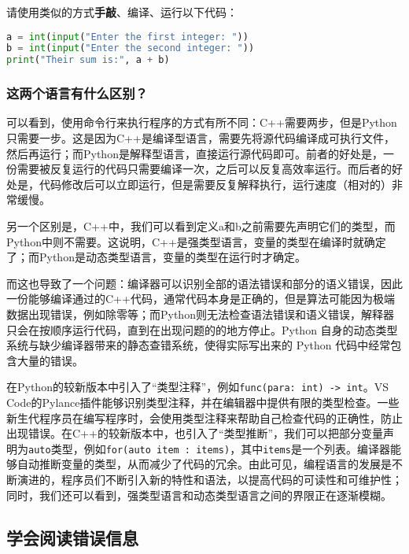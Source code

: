 请使用类似的方式\textbf{手敲}、编译、运行以下代码：

\begin{lstlisting}[language=Python]
a = int(input("Enter the first integer: "))
b = int(input("Enter the second integer: "))
print("Their sum is:", a + b)
\end{lstlisting}

\subsubsection{这两个语言有什么区别？}

可以看到，使用命令行来执行程序的方式有所不同：C++需要两步，但是Python只需要一步。这是因为C++是编译型语言，需要先将源代码编译成可执行文件，然后再运行；而Python是解释型语言，直接运行源代码即可。前者的好处是，一份需要被反复运行的代码只需要编译一次，之后可以反复高效率运行。而后者的好处是，代码修改后可以立即运行，但是需要反复解释执行，运行速度（相对的）非常缓慢。

另一个区别是，C++中，我们可以看到定义a和b之前需要先声明它们的类型，而Python中则不需要。这说明，C++是强类型语言，变量的类型在编译时就确定了；而Python是动态类型语言，变量的类型在运行时才确定。

而这也导致了一个问题：编译器可以识别全部的语法错误和部分的语义错误，因此一份能够编译通过的C++代码，通常代码本身是正确的，但是算法可能因为极端数据出现错误，例如除零等；而Python则无法检查语法错误和语义错误，解释器只会在按顺序运行代码，直到在出现问题的的地方停止。Python 自身的动态类型系统与缺少编译器带来的静态查错系统，使得实际写出来的 Python 代码中经常包含大量的错误。

\begin{note}
  在Python的较新版本中引入了“类型注释”，例如\texttt{func(para: int) -> int}。VS Code的Pylance插件能够识别类型注释，并在编辑器中提供有限的类型检查。一些新生代程序员在编写程序时，会使用类型注释来帮助自己检查代码的正确性，防止出现错误。在C++的较新版本中，也引入了“类型推断”，我们可以把部分变量声明为\texttt{auto}类型，例如\texttt{for(auto item : items)}，其中\texttt{items}是一个列表。编译器能够自动推断变量的类型，从而减少了代码的冗余。由此可见，编程语言的发展是不断演进的，程序员们不断引入新的特性和语法，以提高代码的可读性和可维护性；同时，我们还可以看到，强类型语言和动态类型语言之间的界限正在逐渐模糊。
\end{note}

\subsection{学会阅读错误信息}


